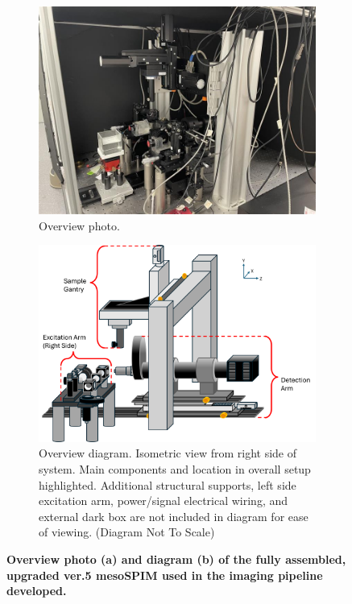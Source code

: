 \begin{figure}[H]
    \centering
    \begin{subfigure}[a]{0.75\textwidth}
    \centering
    \includegraphics[width=1\linewidth]{Images/OverviewPhoto.jpg}
    \caption{Overview photo.}
    \end{subfigure}
    \medskip
   
    \begin{subfigure}[b]{0.75\textwidth}
    \centering
    \includegraphics[width=1\linewidth]{Figures/Overview Diagram.png}
    \caption{Overview diagram. Isometric view from right side of system. Main components and location in overall setup highlighted. Additional structural supports, left side excitation arm, power/signal electrical wiring, and external dark box are not included in diagram for ease of viewing. (Diagram Not To Scale)}
    \end{subfigure}
   
   
    \caption{\textbf{Overview photo (a) and diagram (b) of the fully assembled, upgraded ver.5 mesoSPIM used in the imaging pipeline developed.}}
\end{figure}

